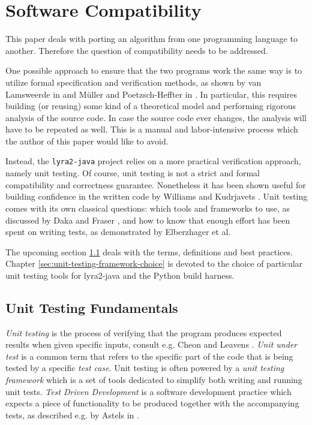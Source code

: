 \section{Software Compatibility}
\label{sec:software-compatibility}

This paper deals with porting an algorithm from one programming language to another. Therefore the question of compatibility needs to be addressed.

One possible approach to ensure that the two programs work the same way is to utilize formal specification and verification methods, as shown by van Lamsweerde in \cite{lamsweerde:2000:formal-specification} and Müller and Poetzsch-Heffter in \cite{mueller:1994:formal-specification}. In particular, this requires building (or reusing) some kind of a theoretical model and performing rigorous analysis of the source code. In case the source code ever changes, the analysis will have to be repeated as well. This is a manual and labor-intensive process which the author of this paper would like to avoid.

Instead, the \texttt{lyra2-java} project relies on a more practical verification approach, namely unit testing. Of course, unit testing is not a strict and formal compatibility and correctness guarantee. Nonetheless it has been shown useful for building confidence in the written code by Williams and Kudrjavets \cite{williams:2010:unit-tests-rock}. Unit testing comes with its own classical questions: which tools and frameworks to use, as discussed by Daka and Fraser \cite{daka:2014:unit-testing-tools}, and how to know that enough effort has been spent on writing tests, as demonstrated by Elberzhager et al. \cite{elberzhager:2012:reducing-effort}

The upcoming section \ref{subsec:unit-testing-fundamentals} deals with the terms, definitions and best practices. Chapter \ref{sec:unit-testing-framework-choice} is devoted to the choice of particular unit testing tools for lyra2-java and the Python build harness.

\subsection{Unit Testing Fundamentals}
\label{subsec:unit-testing-fundamentals}

\emph{Unit testing} is the process of verifying that the program produces expected results when given specific inputs, consult e.g. Cheon and Leavens \cite{cheon2002simple}. \emph{Unit under test} is a common term that refers to the specific part of the code that is being tested by a specific \emph{test case}. Unit testing is often powered by a \emph{unit testing framework} which is a set of tools dedicated to simplify both writing and running unit tests. \emph{Test Driven Development} is a software development practice which expects a piece of functionality to be produced together with the accompanying tests, as described e.g. by Astels in \cite{Astels:2003:TDD:864016}.

